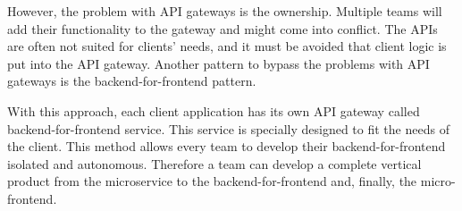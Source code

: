 \bigskip

\noindent However, the problem with API gateways is the ownership. Multiple teams will add their functionality to the gateway and might come into conflict. The APIs are often not suited for clients' needs, and it must be avoided that client logic is put into the API gateway. Another pattern to bypass the problems with API gateways is the backend-for-frontend pattern. \cite[265-266]{book:2018:richardson:background:bff:microservices-patterns}

\bigskip

\noindent With this approach, each client application has its own API gateway called backend-for-frontend service. This service is specially designed to fit the needs of the client. \cite[264-266]{book:2018:richardson:background:bff:microservices-patterns} \cite[71-7]{book:2021:newman:background:bff:micro-services} This method allows every team to develop their backend-for-frontend isolated and autonomous. Therefore a team can develop a complete vertical product from the microservice to the backend-for-frontend and, finally, the micro-frontend. \cite{book:2020:geers:background:micro-frontends:micro-frontends-in-action}
